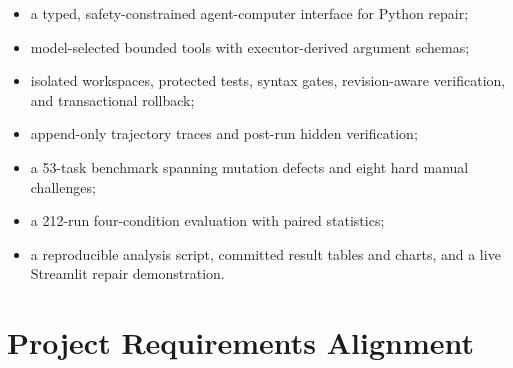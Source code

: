 \documentclass[11pt,a4paper]{article}
\begin{document}
\begin{itemize}
  \item a typed, safety-constrained agent-computer interface for Python repair;
  \item model-selected bounded tools with executor-derived argument schemas;
  \item isolated workspaces, protected tests, syntax gates, revision-aware
  verification, and transactional rollback;
  \item append-only trajectory traces and post-run hidden verification;
  \item a 53-task benchmark spanning mutation defects and eight hard manual
  challenges;
  \item a 212-run four-condition evaluation with paired statistics;
  \item a reproducible analysis script, committed result tables and charts, and
  a live Streamlit repair demonstration.
\end{itemize}

\section{Project Requirements Alignment}
\end{document}
